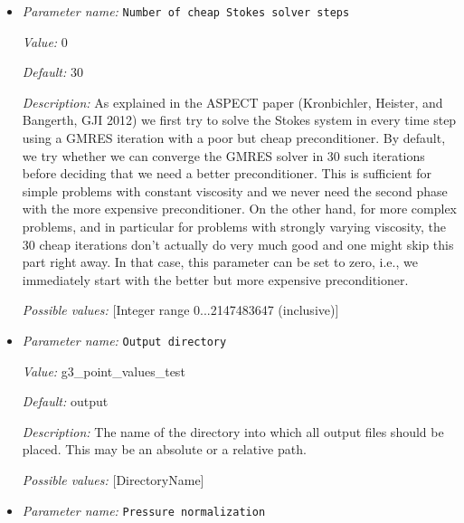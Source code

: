 \begin{itemize}
{\it Value:} 1e-4


{\it Default:} 1e-5


{\it Description:} A relative tolerance up to which the nonlinear solver will iterate. This parameter is only relevant if Nonlinear solver scheme is set to 'iterated Stokes' or 'iterated IMPES'.


{\it Possible values:} [Double 0...1 (inclusive)]
\item {\it Parameter name:} {\tt Number of cheap Stokes solver steps}
\label{parameters:Number of cheap Stokes solver steps}


{\it Value:} 0


{\it Default:} 30


{\it Description:} As explained in the ASPECT paper (Kronbichler, Heister, and Bangerth, GJI 2012) we first try to solve the Stokes system in every time step using a GMRES iteration with a poor but cheap preconditioner. By default, we try whether we can converge the GMRES solver in 30 such iterations before deciding that we need a better preconditioner. This is sufficient for simple problems with constant viscosity and we never need the second phase with the more expensive preconditioner. On the other hand, for more complex problems, and in particular for problems with strongly varying viscosity, the 30 cheap iterations don't actually do very much good and one might skip this part right away. In that case, this parameter can be set to zero, i.e., we immediately start with the better but more expensive preconditioner.


{\it Possible values:} [Integer range 0...2147483647 (inclusive)]
\item {\it Parameter name:} {\tt Output directory}
\label{parameters:Output directory}


{\it Value:} g3_point_values_test


{\it Default:} output


{\it Description:} The name of the directory into which all output files should be placed. This may be an absolute or a relative path.


{\it Possible values:} [DirectoryName]
\item {\it Parameter name:} {\tt Pressure normalization}
\label{parameters:Pressure normalization}



\end{itemize}
